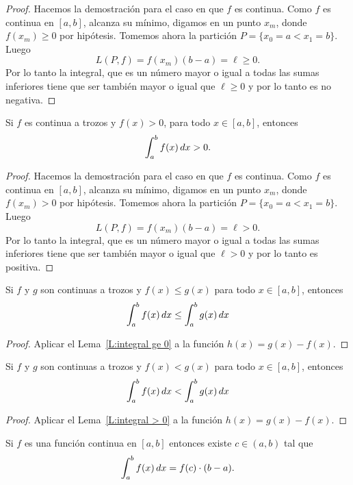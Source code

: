 \begin{proof}
  Hacemos la demostración para el caso en que $f$ es continua.
  Como $f$ es continua en $[a,b]$, alcanza su mínimo, digamos en un punto $x_m$, donde $f(x_m)\ge 0$ por hipótesis. Tomemos ahora la partición $P=\{x_0=a<x_1=b\}$.
  Luego 
  \[
  L(P,f)=f(x_m) (b-a)=\ell \ge 0.
  \]
  Por lo tanto la integral, que es un número mayor o igual a todas las sumas inferiores tiene que ser también mayor o igual que $\ell\ge0$ y por lo tanto es no negativa.
\end{proof}

\begin{lemma}\label{L:integral > 0}
  Si $f$ es continua a trozos y $f(x)> 0$, para todo $x\in [a,b]$, entonces
  \[
  \int_a^b f(x)\,dx > 0.
  \]
\end{lemma}

\begin{proof}
  Hacemos la demostración para el caso en que $f$ es continua.
  Como $f$ es continua en $[a,b]$, alcanza su mínimo, digamos en un punto $x_m$, donde $f(x_m)>0$ por hipótesis. Tomemos ahora la partición $P=\{x_0=a<x_1=b\}$.
  Luego 
  \[
  L(P,f)=f(x_m) (b-a)=\ell > 0.
  \]
  Por lo tanto la integral, que es un número mayor o igual a todas las sumas inferiores tiene que ser también mayor o igual que $\ell>0$ y por lo tanto es positiva.
\end{proof}

\begin{proposition}\label{P:integral monotona}
  Si $f$ y $g$ son continuas a trozos y $f(x)\le g(x)$ para todo $x\in[a,b]$, entonces
  \[
  \int_a^b f(x)\,dx 
  \le \int_a^b g(x)\,dx 
  \]
\end{proposition}

\begin{proof}
  Aplicar el Lema~\ref{L:integral ge 0} a la función $h(x)=g(x)-f(x)$.
\end{proof}

\begin{proposition}
  Si $f$ y $g$ son continuas a trozos y $f(x) < g(x)$ para todo $x\in[a,b]$, entonces
  \[
  \int_a^b f(x)\,dx 
  < \int_a^b g(x)\,dx 
  \]
\end{proposition}

\begin{proof}
  Aplicar el Lema~\ref{L:integral > 0} a la función $h(x)=g(x)-f(x)$.
\end{proof}

\begin{theorem}\label{T:TVM-integral}
  Si $f$ es una función continua en $[a,b]$ entonces existe $c\in(a,b)$ tal que 
  \[
  \int_a^b f(x)\,dx = f(c)\cdot(b-a).
  \]
\end{theorem}

